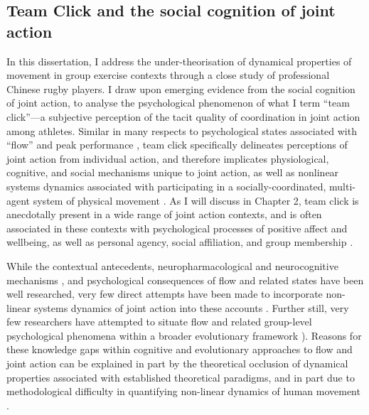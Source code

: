 \subsection{Team Click and the social cognition of joint action}
In this dissertation, I address the under-theorisation of dynamical properties of movement in group exercise contexts through a close study of professional Chinese rugby players.  I draw upon emerging evidence from the social cognition of joint action, to analyse the psychological phenomenon of what I term ``team click''---a subjective perception of the tacit quality of coordination in joint action among athletes.  Similar in many respects to psychological states associated with ``flow'' and peak performance \citep{Csikszentmihalyi1992}, team click specifically delineates perceptions of joint action from individual action, and therefore implicates physiological, cognitive, and social mechanisms unique to joint action, as well as nonlinear systems dynamics associated with participating in a socially-coordinated, multi-agent system of physical movement \citep{Kelso2009}. As I will discuss in Chapter 2, team click is anecdotally present in a wide range of joint action contexts, and is often associated in these contexts with psychological processes of positive affect and wellbeing, as well as personal agency, social affiliation, and group membership \citep{Jackson1995,Marsh2009,Wheatley2012,Slingerland2014}.

While the contextual antecedents\citep{Fong2015}, neuropharmacological \citep{Boecker2008} and neurocognitive mechanisms \citep{Dietrich2004,Dietrich2011,Cheron2016}, and psychological consequences \citep{Wheatley2012} of flow and related states have been well researched, very few direct attempts have been made to incorporate non-linear systems dynamics of joint action into these accounts \citep[but see][]{Marsh2009}.  Further still, very few researchers have attempted to situate flow and related group-level psychological phenomena within a broader evolutionary framework \citep[but, for a general theoretical proposal, see][]{Slingerland2014}).  Reasons for these knowledge gaps within cognitive and evolutionary approaches to flow and joint action can be explained in part by the theoretical occlusion of dynamical properties associated with established theoretical paradigms, and in part due to methodological difficulty in quantifying non-linear dynamics of human movement \citep{Kelso2009}.

